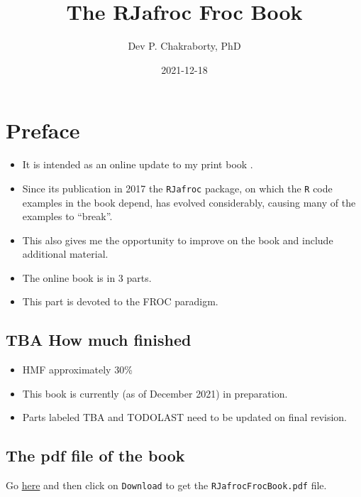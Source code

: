 \documentclass[
]{book}
\title{The RJafroc Froc Book}
\author{Dev P. Chakraborty, PhD}
\date{2021-12-18}
\providecommand{\tightlist}{%
  \setlength{\itemsep}{0pt}\setlength{\parskip}{0pt}}
\begin{document}
\maketitle

{
\setcounter{tocdepth}{1}
\tableofcontents
}
\hypertarget{preface}{%
\chapter*{Preface}\label{preface}}

\begin{itemize}
\tightlist
\item
  It is intended as an online update to my print book \citep{chakraborty2017observer}.
\item
  Since its publication in 2017 the \texttt{RJafroc} package, on which the \texttt{R} code examples in the book depend, has evolved considerably, causing many of the examples to ``break''.
\item
  This also gives me the opportunity to improve on the book and include additional material.
\item
  The online book is in 3 parts.
\item
  This part is devoted to the FROC paradigm.
\end{itemize}

\hypertarget{tba-how-much-finished}{%
\section*{TBA How much finished}\label{tba-how-much-finished}}

\begin{itemize}
\tightlist
\item
  HMF approximately 30\%
\item
  This book is currently (as of December 2021) in preparation.
\item
  Parts labeled TBA and TODOLAST need to be updated on final revision.
\end{itemize}

\hypertarget{the-pdf-file-of-the-book}{%
\section*{The pdf file of the book}\label{the-pdf-file-of-the-book}}

Go \href{https://github.com/dpc10ster/RJafrocFrocBook/blob/gh-pages/RJafrocFrocBook.pdf}{here} and then click on \texttt{Download} to get the \texttt{RJafrocFrocBook.pdf} file.
\end{document}
